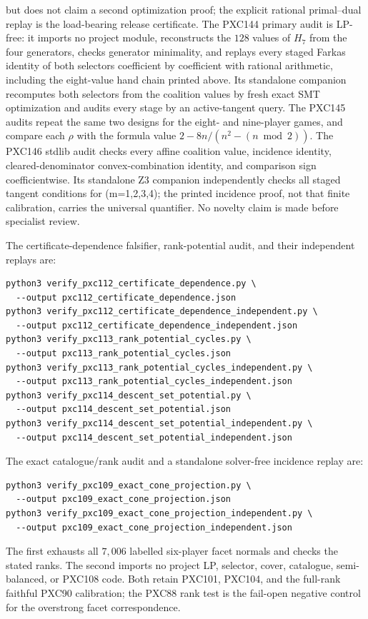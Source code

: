\documentclass[11pt]{article}
\begin{document}
but does not claim a second optimization proof; the explicit rational
primal--dual replay is the load-bearing release certificate.
The PXC144 primary audit is LP-free: it imports no project module,
reconstructs the \(128\) values of \(H_7\) from the four generators, checks
generator minimality, and replays every staged Farkas identity of both
selectors coefficient by coefficient with rational arithmetic, including
the eight-value hand chain printed above.  Its standalone companion
recomputes both selectors from the coalition values by fresh exact SMT
optimization and audits every stage by an active-tangent query.  The
PXC145 audits repeat the same two designs for the eight- and nine-player
games, and compare each \(\rho\) with the formula value \(2-8n/(n^2-(n\bmod2))\).
The PXC146 stdlib audit checks every affine coalition value, incidence
identity, cleared-denominator convex-combination identity, and comparison
sign coefficientwise.  Its standalone Z3 companion independently checks
all staged tangent conditions for (m=1,2,3,4); the printed incidence proof,
not that finite calibration, carries the universal quantifier.
No novelty claim is made before specialist review.

The certificate-dependence falsifier, rank-potential audit, and their
independent replays are:
\begin{verbatim}
python3 verify_pxc112_certificate_dependence.py \
  --output pxc112_certificate_dependence.json
python3 verify_pxc112_certificate_dependence_independent.py \
  --output pxc112_certificate_dependence_independent.json
python3 verify_pxc113_rank_potential_cycles.py \
  --output pxc113_rank_potential_cycles.json
python3 verify_pxc113_rank_potential_cycles_independent.py \
  --output pxc113_rank_potential_cycles_independent.json
python3 verify_pxc114_descent_set_potential.py \
  --output pxc114_descent_set_potential.json
python3 verify_pxc114_descent_set_potential_independent.py \
  --output pxc114_descent_set_potential_independent.json
\end{verbatim}

The exact catalogue/rank audit and a standalone solver-free incidence replay
are:
\begin{verbatim}
python3 verify_pxc109_exact_cone_projection.py \
  --output pxc109_exact_cone_projection.json
python3 verify_pxc109_exact_cone_projection_independent.py \
  --output pxc109_exact_cone_projection_independent.json
\end{verbatim}
The first exhausts all \(7{,}006\) labelled six-player facet normals and
checks the stated ranks.  The second imports no project LP, selector, cover,
catalogue, semi-balanced, or PXC108 code.  Both retain PXC101, PXC104, and the
full-rank faithful PXC90 calibration; the PXC88 rank test is the fail-open
negative control for the overstrong facet correspondence.
\end{document}
